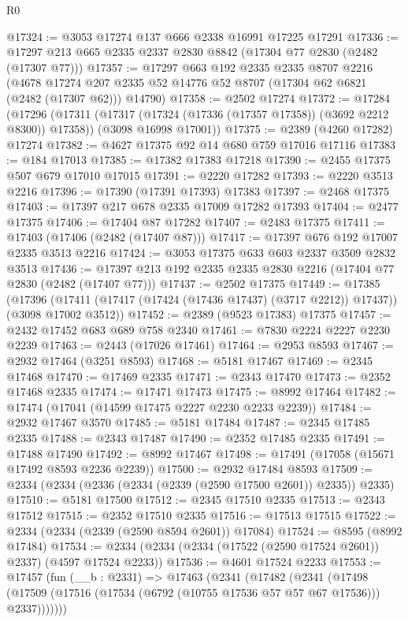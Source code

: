 \begin{lexlean}{R0}
\begin{coremodule}
@17324 := @3053 @17274 @137 @666 @2338 @16991 @17225 @17291
@17336 := @17297 @213 @665 @2335 @2337 @2830 @8842 (@17304 @77 @2830 (@2482 (@17307 @77)))
@17357 := @17297
    @663
    @192
    @2335
    @2335
    @8707
    @2216
    (@4678 @17274 @207 @2335 @52 @14776 @52 @8707 (@17304 @62 @6821 (@2482 (@17307 @62))) @14790)
@17358 := @2502 @17274
@17372 := @17284
    (@17296
      (@17311 (@17317 (@17324 (@17336 (@17357 @17358)) (@3692 @2212 @8300)) @17358))
      (@3098 @16998 @17001))
@17375 := @2389 (@4260 @17282) @17274
@17382 := @4627 @17375 @92 @14 @680 @759 @17016 @17116
@17383 := @184 @17013
@17385 := @17382 @17383 @17218
@17390 := @2455 @17375 @507 @679 @17010 @17015
@17391 := @2220 @17282
@17393 := @2220 @3513 @2216
@17396 := @17390 (@17391 @17393) @17383
@17397 := @2468 @17375
@17403 := @17397 @217 @678 @2335 @17009 @17282 @17393
@17404 := @2477 @17375
@17406 := @17404 @87 @17282
@17407 := @2483 @17375
@17411 := @17403 (@17406 (@2482 (@17407 @87)))
@17417 := @17397 @676 @192 @17007 @2335 @3513 @2216
@17424 := @3053 @17375 @633 @603 @2337 @3509 @2832 @3513
@17436 := @17397 @213 @192 @2335 @2335 @2830 @2216 (@17404 @77 @2830 (@2482 (@17407 @77)))
@17437 := @2502 @17375
@17449 := @17385
    (@17396 (@17411 (@17417 (@17424 (@17436 @17437) (@3717 @2212)) @17437)) (@3098 @17002 @3512))
@17452 := @2389 (@9523 @17383) @17375
@17457 := @2432 @17452 @683 @689 @758 @2340
@17461 := @7830 @2224 @2227 @2230 @2239
@17463 := @2443 (@17026 @17461)
@17464 := @2953 @8593
@17467 := @2932 @17464 (@3251 @8593)
@17468 := @5181 @17467
@17469 := @2345 @17468
@17470 := @17469 @2335
@17471 := @2343 @17470
@17473 := @2352 @17468 @2335
@17474 := @17471 @17473
@17475 := @8992 @17464
@17482 := @17474 (@17041 (@14599 @17475 @2227 @2230 @2233 @2239))
@17484 := @2932 @17467 @3570
@17485 := @5181 @17484
@17487 := @2345 @17485 @2335
@17488 := @2343 @17487
@17490 := @2352 @17485 @2335
@17491 := @17488 @17490
@17492 := @8992 @17467
@17498 := @17491 (@17058 (@15671 @17492 @8593 @2236 @2239))
@17500 := @2932 @17484 @8593
@17509 := @2334 (@2334 (@2336 (@2334 (@2339 (@2590 @17500 @2601)) @2335)) @2335)
@17510 := @5181 @17500
@17512 := @2345 @17510 @2335
@17513 := @2343 @17512
@17515 := @2352 @17510 @2335
@17516 := @17513 @17515
@17522 := @2334 (@2334 (@2339 (@2590 @8594 @2601)) @17084)
@17524 := @8595 (@8992 @17484)
@17534 := @2334 (@2334 (@2334 (@17522 (@2590 @17524 @2601)) @2337) (@4597 @17524 @2233))
@17536 := @4601 @17524 @2233
@17553 := @17457
    (fun (__b : @2331) =>
    @17463
      (@2341
        (@17482
          (@2341
            (@17498 (@17509 (@17516 (@17534 (@6792 (@10755 @17536 @57 @57 @67 @17536))) @2337)))))))

\end{coremodule}
\end{lexlean}
